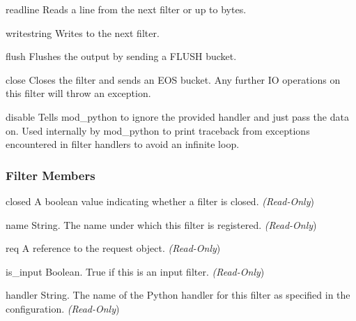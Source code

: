 \begin{methoddesc}[filter]{readline}{}
Reads a line from the next filter or up to  bytes.
\end{methoddesc}

\begin{methoddesc}[filter]{write}{string}
Writes  to the next filter.
\end{methoddesc}

\begin{methoddesc}[filter]{flush}{}
Flushes the output by sending a FLUSH bucket.
\end{methoddesc}

\begin{methoddesc}[filter]{close}{}
Closes the filter and sends an EOS bucket. Any further IO operations on
this filter will throw an exception.
\end{methoddesc}

\begin{methoddesc}[filter]{disable}{}
Tells mod_python to ignore the provided handler and just pass the data
on. Used internally by mod_python to print traceback from exceptions
encountered in filter handlers to avoid an infinite loop.
\end{methoddesc}

\subsubsection{Filter Members\label{pyapi-mpfilt-mem}}

\begin{memberdesc}[filter]{closed}
A boolean value indicating whether a filter is closed.
\emph{(Read-Only})
\end{memberdesc}

\begin{memberdesc}[filter]{name}
String. The name under which this filter is registered.
\emph{(Read-Only})
\end{memberdesc}

\begin{memberdesc}[filter]{req}
A reference to the request object.
\emph{(Read-Only})
\end{memberdesc}

\begin{memberdesc}[filter]{is_input}
Boolean. True if this is an input filter.
\emph{(Read-Only})
\end{memberdesc}

\begin{memberdesc}[filter]{handler}
String. The name of the Python handler for this filter as specified in
the configuration. 
\emph{(Read-Only})
\end{memberdesc}

